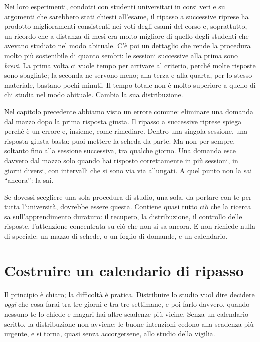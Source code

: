 Nei loro esperimenti, condotti con studenti universitari in corsi veri
e su argomenti che sarebbero stati chiesti all'esame, il ripasso a
successive riprese ha prodotto miglioramenti consistenti nei voti degli
esami del corso e, soprattutto, un ricordo che a distanza di mesi era
molto migliore di quello degli studenti che avevano studiato nel modo
abituale. C'è poi un dettaglio
che rende la procedura molto più sostenibile di quanto sembri: le
sessioni successive alla prima sono \emph{brevi}. La prima volta ci
vuole tempo per arrivare al criterio, perché molte risposte sono
sbagliate; la seconda ne servono meno; alla terza e alla quarta, per lo
stesso materiale, bastano pochi minuti. Il tempo totale non è molto
superiore a quello di chi studia nel modo abituale. Cambia la sua
distribuzione.

Nel capitolo precedente abbiamo visto un errore comune: eliminare una
domanda dal mazzo dopo la prima risposta giusta. Il ripasso a
successive riprese spiega perché è un errore e, insieme, come
rimediare. Dentro una singola sessione, una risposta giusta basta:
puoi mettere la scheda da parte. Ma non per sempre, soltanto fino alla
sessione successiva, tra qualche giorno. Una domanda esce davvero dal
mazzo solo quando hai risposto correttamente in più sessioni, in giorni
diversi, con intervalli che si sono via via allungati. A quel punto non
la sai \enquote{ancora}: la sai.

Se dovessi scegliere una sola procedura di studio, una sola, da portare
con te per tutta l'università, dovrebbe essere questa. Contiene quasi
tutto ciò che la ricerca sa sull'apprendimento duraturo: il recupero,
la distribuzione, il controllo delle risposte, l'attenzione concentrata
su ciò che non si sa ancora. E non richiede nulla di speciale: un mazzo
di schede, o un foglio di domande, e un calendario.

\section{Costruire un calendario di ripasso}

Il principio è chiaro; la difficoltà è pratica. Distribuire lo studio
vuol dire decidere \emph{oggi} che cosa farai tra tre giorni e tra tre
settimane, e poi farlo davvero, quando nessuno te lo chiede e magari
hai altre scadenze più vicine. Senza un calendario scritto, la
distribuzione non avviene: le buone intenzioni cedono alla scadenza
più urgente, e si torna, quasi senza accorgersene, allo studio della
vigilia.

